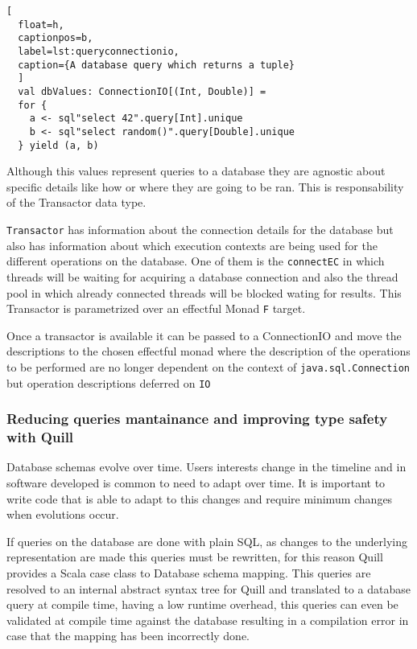 \documentclass[../main.tex]{subfiles}
\begin{document}
\begin{lstlisting}[
  float=h,
  captionpos=b,
  label=lst:queryconnectionio,
  caption={A database query which returns a tuple}
  ]
  val dbValues: ConnectionIO[(Int, Double)] =
  for {
    a <- sql"select 42".query[Int].unique
    b <- sql"select random()".query[Double].unique
  } yield (a, b)
\end{lstlisting}

Although this values represent queries to a database they are agnostic about
specific details like how or where they are going to be ran. This is
responsability of the Transactor data type.

\texttt{Transactor} has information about the connection details for the
database but also has information about which execution contexts are being used
for the different operations on the database. One of them is the
\texttt{connectEC} in which threads will be waiting for acquiring a database
connection and also the thread pool in which already connected threads will be
blocked wating for results. This Transactor is parametrized over an effectful
Monad \texttt{F} target.

Once a transactor is available it can be passed to a ConnectionIO and move the
descriptions to the chosen effectful monad where the description of the
operations to be performed are no longer dependent on the context of
\texttt{java.sql.Connection} but operation descriptions deferred on \texttt{IO}

\subsubsection{Reducing queries mantainance and improving type safety with Quill}
Database schemas evolve over time. Users interests change in the timeline and in
software developed is common to need to adapt over time. It is important to
write code that is able to adapt to this changes and require minimum changes
when evolutions occur.

If queries on the database are done with plain SQL, as changes to the underlying
representation are made this queries must be rewritten, for this reason Quill
provides a Scala case class to Database schema mapping. This queries are
resolved to an internal abstract syntax tree for Quill and translated to a
database query at compile time, having a low runtime overhead, this queries can
even be validated at compile time against the database resulting in a
compilation error in case that the mapping has been incorrectly done.
\end{document}
